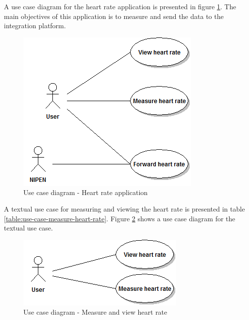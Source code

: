 A use case diagram for the heart rate application is presented in figure \ref{figure:use-case-diagram-heart-rate}.
The main objectives of this application is to measure and send the data to the integration platform.

\begin{figure}[H]
\centering
\includegraphics[scale=0.6]{../Figures/use-case-diagram-heart-rate.png}
\caption{Use case diagram - Heart rate application}
\label{figure:use-case-diagram-heart-rate}
\end{figure}

A textual use case for measuring and viewing the heart rate is presented in table \ref{table:use-case-measure-heart-rate}.
Figure \ref{figure:use-case-diagram-measure-heart-rate} shows a use case diagram for the textual use case.

\begin{figure}[H]
\centering
\includegraphics[scale=0.75]{../Figures/use-case-diagram-measure-and-view-heart-rate.png}
\caption{Use case diagram - Measure and view heart rate}
\label{figure:use-case-diagram-measure-heart-rate}
\end{figure}


